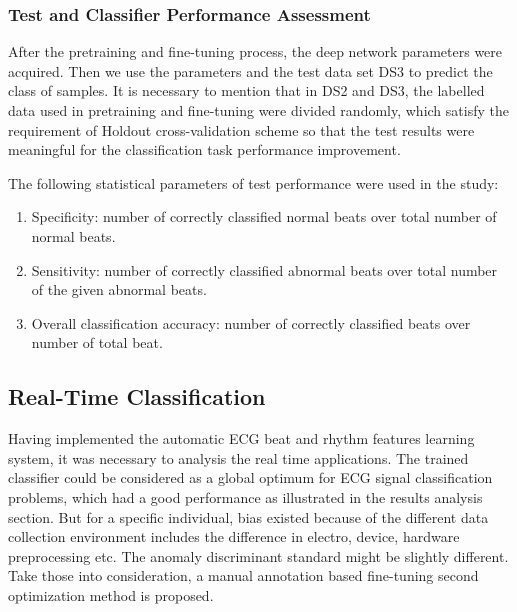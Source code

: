 \documentclass[journal]{IEEEtran}
\begin{document}
\subsubsection{Test and Classifier Performance Assessment}
After the pretraining and fine-tuning process, the deep network parameters were acquired. Then we use the parameters and the test data set DS3 to predict the class of samples. 
It is necessary to mention that in DS2 and DS3, the labelled data used in pretraining and fine-tuning were divided randomly, which satisfy the requirement of Holdout cross-validation scheme so that the test results were meaningful for the classification task performance improvement.

The following statistical parameters of test performance were used in the study:
\begin{enumerate}
\item Specificity: number of correctly classified normal beats over total number of normal beats.
\item Sensitivity: number of correctly classified abnormal beats over total number of the given abnormal beats.
\item Overall classification accuracy: number of correctly classified beats over number of total beat.
\end{enumerate}

\subsection{Real-Time Classification}
Having implemented the automatic ECG beat and rhythm features learning system, it was necessary to analysis the real time applications. 
The trained classifier could be considered as a global optimum for ECG signal classification problems, which had a good performance as illustrated in the results analysis section.
But for a specific individual, bias existed because of the different data collection environment includes the difference in electro, device, hardware preprocessing etc. 
The anomaly discriminant standard might be slightly different. 
Take those into consideration, a manual annotation based fine-tuning second optimization method is proposed.
\end{document}
